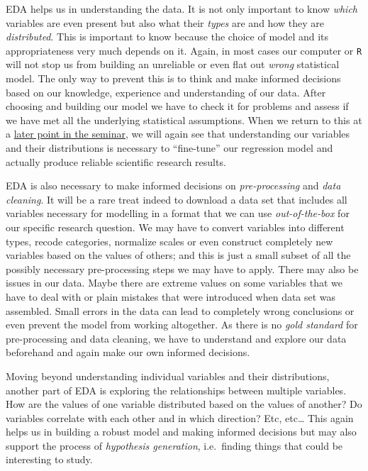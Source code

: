 \documentclass[
]{book}
\begin{document}
EDA helps us in understanding the data. It is not only important to know \emph{which} variables are even present but also what their \emph{types} are and how they are \emph{distributed}. This is important to know because the choice of model and its appropriateness very much depends on it. Again, in most cases our computer or \texttt{R} will not stop us from building an unreliable or even flat out \emph{wrong} statistical model. The only way to prevent this is to think and make informed decisions based on our knowledge, experience and understanding of our data. After choosing and building our model we have to check it for problems and assess if we have met all the underlying statistical assumptions. When we return to this at a \protect\hyperlink{lin-t-3}{later point in the seminar}, we will again see that understanding our variables and their distributions is necessary to ``fine-tune'' our regression model and actually produce reliable scientific research results.

EDA is also necessary to make informed decisions on \emph{pre-processing} and \emph{data cleaning}. It will be a rare treat indeed to download a data set that includes all variables necessary for modelling in a format that we can use \emph{out-of-the-box} for our specific research question. We may have to convert variables into different types, recode categories, normalize scales or even construct completely new variables based on the values of others; and this is just a small subset of all the possibly necessary pre-processing steps we may have to apply. There may also be issues in our data. Maybe there are extreme values on some variables that we have to deal with or plain mistakes that were introduced when data set was assembled. Small errors in the data can lead to completely wrong conclusions or even prevent the model from working altogether. As there is no \emph{gold standard} for pre-processing and data cleaning, we have to understand and explore our data beforehand and again make our own informed decisions.

Moving beyond understanding individual variables and their distributions, another part of EDA is exploring the relationships between multiple variables. How are the values of one variable distributed based on the values of another? Do variables correlate with each other and in which direction? Etc, etc\ldots{} This again helps us in building a robust model and making informed decisions but may also support the process of \emph{hypothesis generation}, i.e.~finding things that could be interesting to study.
\end{document}
